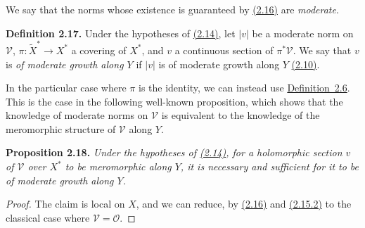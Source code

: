\documentclass{report}
\newenvironment{itenv}[1]
  {\phantomsection\par\medskip\noindent\textbf{#1.}\itshape}
  {\par\medskip}
\newenvironment{rmenv}[1]
  {\phantomsection\par\medskip\noindent\textbf{#1.}\rmfamily}
  {\par\medskip}
\renewcommand{\cal}[1]{{\mathcal{#1}}}
\newcommand{\oldpage}[1]{\marginpar{\footnotesize$\Big\vert$ \textit{p.~#1}}}
\begin{document}
We say that the norms whose existence is guaranteed by \hyperref[II.2.16]{(2.16)} are \emph{moderate}.

\oldpage{68}
\begin{rmenv}{Definition 2.17}
\label{II.2.17}
  Under the hypotheses of \hyperref[II.2.14]{(2.14)}, let $|v|$ be a moderate norm on $\cal{V}$, $\pi\colon\widetilde{X}^*\to X^*$ a covering of $X^*$, and $v$ a continuous section of $\pi^*\cal{V}$.
  We say that $v$ is \emph{of moderate growth along $Y$} if $|v|$ is of moderate growth along $Y$ \hyperref[II.2.10]{(2.10)}.
\end{rmenv}

In the particular case where $\pi$ is the identity, we can instead use \hyperref[II.2.6]{Definition~2.6}.
This is the case in the following well-known proposition, which shows that the knowledge of moderate norms on $\cal{V}$ is equivalent to the knowledge of the meromorphic structure of $\cal{V}$ along $Y$.

\begin{itenv}{Proposition 2.18}
\label{II.2.18}
  Under the hypotheses of \hyperref[II.2.14]{(2.14)}, for a holomorphic section $v$ of $\cal{V}$ over $X^*$ to be meromorphic along $Y$, it is necessary and sufficient for it to be of moderate growth along $Y$.
\end{itenv}

\begin{proof}
  The claim is local on $X$, and we can reduce, by \hyperref[II.2.16]{(2.16)} and \hyperref[II.2.15.2]{(2.15.2)} to the classical case where $\cal{V}=\cal{O}$.
\end{proof}
\end{document}
